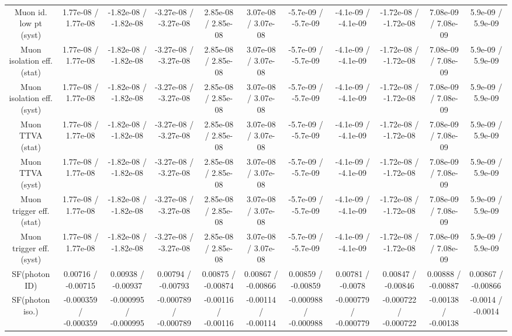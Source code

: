 \begin{table}[htbp]
\begin{center}
\begin{tabular}{|c|c|c|c|c|c|c|c|c|c|c|}
  Muon id. low pt (syst) & 1.77e-08 / 1.77e-08 & -1.82e-08 / -1.82e-08 & -3.27e-08 / -3.27e-08 & 2.85e-08 / 2.85e-08 & 3.07e-08 / 3.07e-08 & -5.7e-09 / -5.7e-09 & -4.1e-09 / -4.1e-09 & -1.72e-08 / -1.72e-08 & 7.08e-09 / 7.08e-09 & 5.9e-09 / 5.9e-09 \\ 
  Muon isolation eff. (stat) & 1.77e-08 / 1.77e-08 & -1.82e-08 / -1.82e-08 & -3.27e-08 / -3.27e-08 & 2.85e-08 / 2.85e-08 & 3.07e-08 / 3.07e-08 & -5.7e-09 / -5.7e-09 & -4.1e-09 / -4.1e-09 & -1.72e-08 / -1.72e-08 & 7.08e-09 / 7.08e-09 & 5.9e-09 / 5.9e-09 \\ 
  Muon isolation eff. (syst) & 1.77e-08 / 1.77e-08 & -1.82e-08 / -1.82e-08 & -3.27e-08 / -3.27e-08 & 2.85e-08 / 2.85e-08 & 3.07e-08 / 3.07e-08 & -5.7e-09 / -5.7e-09 & -4.1e-09 / -4.1e-09 & -1.72e-08 / -1.72e-08 & 7.08e-09 / 7.08e-09 & 5.9e-09 / 5.9e-09 \\ 
  Muon TTVA (stat) & 1.77e-08 / 1.77e-08 & -1.82e-08 / -1.82e-08 & -3.27e-08 / -3.27e-08 & 2.85e-08 / 2.85e-08 & 3.07e-08 / 3.07e-08 & -5.7e-09 / -5.7e-09 & -4.1e-09 / -4.1e-09 & -1.72e-08 / -1.72e-08 & 7.08e-09 / 7.08e-09 & 5.9e-09 / 5.9e-09 \\ 
  Muon TTVA (syst) & 1.77e-08 / 1.77e-08 & -1.82e-08 / -1.82e-08 & -3.27e-08 / -3.27e-08 & 2.85e-08 / 2.85e-08 & 3.07e-08 / 3.07e-08 & -5.7e-09 / -5.7e-09 & -4.1e-09 / -4.1e-09 & -1.72e-08 / -1.72e-08 & 7.08e-09 / 7.08e-09 & 5.9e-09 / 5.9e-09 \\ 
  Muon trigger eff. (stat) & 1.77e-08 / 1.77e-08 & -1.82e-08 / -1.82e-08 & -3.27e-08 / -3.27e-08 & 2.85e-08 / 2.85e-08 & 3.07e-08 / 3.07e-08 & -5.7e-09 / -5.7e-09 & -4.1e-09 / -4.1e-09 & -1.72e-08 / -1.72e-08 & 7.08e-09 / 7.08e-09 & 5.9e-09 / 5.9e-09 \\ 
  Muon trigger eff. (syst) & 1.77e-08 / 1.77e-08 & -1.82e-08 / -1.82e-08 & -3.27e-08 / -3.27e-08 & 2.85e-08 / 2.85e-08 & 3.07e-08 / 3.07e-08 & -5.7e-09 / -5.7e-09 & -4.1e-09 / -4.1e-09 & -1.72e-08 / -1.72e-08 & 7.08e-09 / 7.08e-09 & 5.9e-09 / 5.9e-09 \\ 
  SF(photon ID) & 0.00716 / -0.00715 & 0.00938 / -0.00937 & 0.00794 / -0.00793 & 0.00875 / -0.00874 & 0.00867 / -0.00866 & 0.00859 / -0.00859 & 0.00781 / -0.0078 & 0.00847 / -0.00846 & 0.00888 / -0.00887 & 0.00867 / -0.00866 \\ 
  SF(photon iso.) & -0.000359 / -0.000359 & -0.000995 / -0.000995 & -0.000789 / -0.000789 & -0.00116 / -0.00116 & -0.00114 / -0.00114 & -0.000988 / -0.000988 & -0.000779 / -0.000779 & -0.000722 / -0.000722 & -0.00138 / -0.00138 & -0.0014 / -0.0014 \\ 

\end{tabular}
\end{center}
\end{table}
